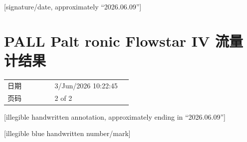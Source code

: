 \documentclass[UTF8,10pt,a4paper,fontset=fandol]{ctexart}
\newcommand{\fieldvalue}[1]{#1}
\newcommand{\handwritten}[1]{#1}
\begin{document}
\vspace{1em}

\handwritten{[signature/date, approximately ``2026.06.09'']}

\section*{PALL Palt ronic Flowstar IV 流量计结果}

\begin{tabular}{@{}p{0.34\linewidth}p{0.56\linewidth}@{}}
日期 &
\fieldvalue{3/Jun/2026 10:22:45}
\\[2pt]
页码 &
\fieldvalue{2 of 2}
\end{tabular}

\vspace{1em}

\begin{center}
\begin{minipage}{0.82\linewidth}
\centering
{}
\end{minipage}
\end{center}

\vspace{1em}

\handwritten{[illegible handwritten annotation, approximately ending in ``2026.06.09'']}

\handwritten{[illegible blue handwritten number/mark]}
\end{document}

